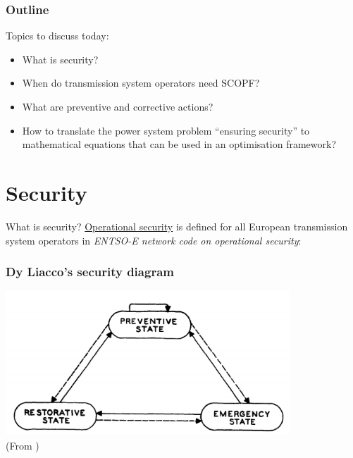 \documentclass[compress]{beamer}
\newcommand*{\citec}[1]{(From \cite{#1})}
\begin{document}
\begin{frame}
\frametitle{Outline}  
Topics to discuss today:
\begin{itemize}
\item What is security?
\item When do transmission system operators need SCOPF?
\item What are preventive and corrective actions?
\item How to translate the power system problem ``ensuring security'' to mathematical equations that can be used in an optimisation framework?
\end{itemize}
\end{frame}

\section{Security}
\begin{frame}{What is security?}
\underline{Operational security} is defined for all European transmission system operators in \emph{ENTSO-E network code on operational security}:
\begin{block}{}
\end{block}
\end{frame}

\begin{frame}
  \frametitle{Dy Liacco's security diagram}
\centering  \includegraphics[width=0.8\textwidth]{Figs/DyLiacco_SecurityDiagram.png}\\
  \citec{DyLiacco1967Adaptive}
\end{frame}
\end{document}
